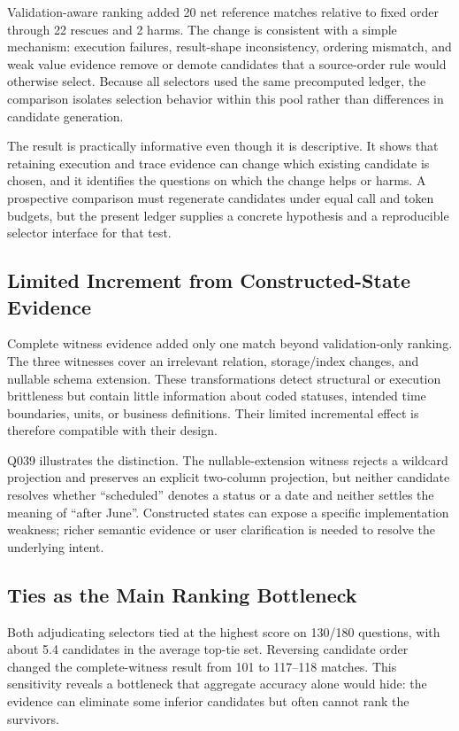 \documentclass[applsci,article,submit,moreauthors]{Definitions/mdpi}
\begin{document}
Validation-aware ranking added 20 net reference matches relative to fixed order through 22 rescues and 2 harms. The change is consistent with a simple mechanism: execution failures, result-shape inconsistency, ordering mismatch, and weak value evidence remove or demote candidates that a source-order rule would otherwise select. Because all selectors used the same precomputed ledger, the comparison isolates selection behavior within this pool rather than differences in candidate generation.

The result is practically informative even though it is descriptive. It shows that retaining execution and trace evidence can change which existing candidate is chosen, and it identifies the questions on which the change helps or harms. A prospective comparison must regenerate candidates under equal call and token budgets, but the present ledger supplies a concrete hypothesis and a reproducible selector interface for that test.

\subsection{Limited Increment from Constructed-State Evidence}

Complete witness evidence added only one match beyond validation-only ranking. The three witnesses cover an irrelevant relation, storage/index changes, and nullable schema extension. These transformations detect structural or execution brittleness but contain little information about coded statuses, intended time boundaries, units, or business definitions. Their limited incremental effect is therefore compatible with their design.

Q039 illustrates the distinction. The nullable-extension witness rejects a wildcard projection and preserves an explicit two-column projection, but neither candidate resolves whether ``scheduled'' denotes a status or a date and neither settles the meaning of ``after June''. Constructed states can expose a specific implementation weakness; richer semantic evidence or user clarification is needed to resolve the underlying intent.

\subsection{Ties as the Main Ranking Bottleneck}

Both adjudicating selectors tied at the highest score on 130/180 questions, with about 5.4 candidates in the average top-tie set. Reversing candidate order changed the complete-witness result from 101 to 117--118 matches. This sensitivity reveals a bottleneck that aggregate accuracy alone would hide: the evidence can eliminate some inferior candidates but often cannot rank the survivors.
\end{document}
